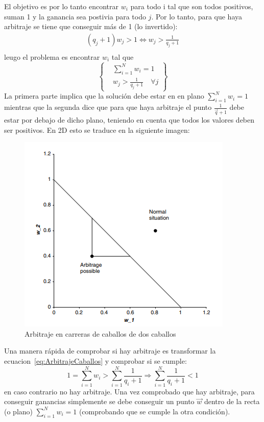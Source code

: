 El objetivo es por lo tanto encontrar $w_i$ para todo i tal que son todos positivos, suman 1 y la ganancia sea postivia para todo $j$. Por lo tanto, para que haya arbitraje se tiene que conseguir más de 1 (lo invertido):
\begin{align*}
    (q_j + 1)w_j > 1 \Leftrightarrow w_j > \frac{1}{q_j + 1} \\
\end{align*}
leugo el problema es encontrar $w_i$ tal que
\[
    \left\{
    \begin{aligned}\label{eq:ArbitrajeCaballos}
        &\sum_{i=1}^N w_i = 1 \\
        &w_j > \frac{1}{q_j + 1} \quad \forall j
    \end{aligned}
    \right\}
\]
La primera parte implica que la solución debe estar en en plano $\sum_{i=1}^N w_i = 1$ mientras que la segunda dice que para que haya arbitraje el punto $\frac{1}{\vec{q} + 1}$ debe estar por debajo de dicho plano, teniendo en cuenta que todos los valores deben ser positivos. En 2D esto se traduce en la siguiente imagen:
\begin{figure}[H]
    \centering
    \includegraphics[width=0.65\linewidth]{Imagenes/3_Aleatoriedad/Arbitraje_Cabllos.png}
    \caption{Arbitraje en carreras de caballos de dos caballos}
\end{figure}

Una manera rápida de comprobar si hay arbitraje es transformar la ecuacion~\eqref{eq:ArbitrajeCaballos} y comprobar si se cumple:
\[
    1 = \sum_{i=1}^N w_i > \sum_{i=1}^N \frac{1}{q_i + 1} \Rightarrow  \boxed{\sum_{i=1}^N \frac{1}{q_i + 1} < 1}
\]
en caso contrario no hay arbitraje. Una vez comprobado que hay arbitraje, para conseguir ganancias simplemente se debe conseguir un punto $\vec{w}$ dentro de la recta (o plano) $\sum_{i=1}^N w_i = 1$ (comprobando que se cumple la otra condición).





